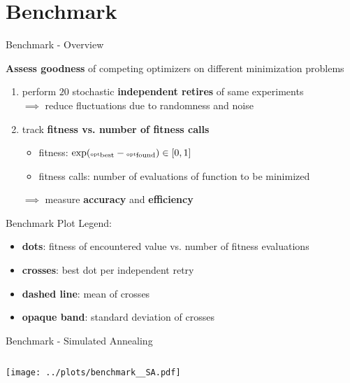 \documentclass[11pt,aspectratio=169]{beamer}
\begin{document}
\section{Benchmark}

\begin{frame}{Benchmark - Overview}

    \textbf{Assess goodness} of competing optimizers on different minimization problems
    \begin{enumerate}
        \item perform $20$ stochastic \textbf{independent retires} of same experiments\\
            $\implies$ reduce fluctuations due to randomness and noise
        \item track \textbf{fitness vs. number of fitness calls}
            \begin{itemize}
                \item fitness: $\exp({\tiny{\text{opt}_\text{best}}} - {\tiny{\text{opt}_\text{found}}}) \in \lbrack 0,1\rbrack$
                \item fitness calls: number of evaluations of function to be minimized
            \end{itemize}
            $\implies$ measure \textbf{accuracy} and \textbf{efficiency}
    \end{enumerate}

    \medskip

    Benchmark Plot Legend:
    \begin{itemize}
        \item \textbf{dots}: fitness of encountered value vs. number of fitness evaluations
        \item \textbf{crosses}: best dot per independent retry
        \item \textbf{dashed line}: mean of crosses
        \item \textbf{opaque band}: standard deviation of crosses
    \end{itemize}
\end{frame}

\begin{frame}[fragile]{Benchmark - Simulated Annealing}
    \begin{columns}
    \begin{column}{0.8\textwidth}
        \texttt{[image: ../plots/benchmark\_\_SA.pdf]}
    \end{column}
    \end{columns}
\end{frame}
\end{document}

